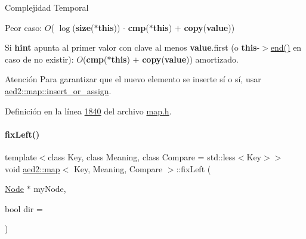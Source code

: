 \begin{DoxyDescription}
\item[Complejidad Temporal]
\begin{DoxyItemize}
\item Peor caso\+: $O$( $\log$({\bfseries size}({\bfseries $\ast$this})) $\cdot$ {\bfseries cmp}({\bfseries $\ast$this}) $+$ {\bfseries copy}({\bfseries value}))
\item Si {\bfseries hint} apunta al primer valor con clave al menos {\bfseries value}.first (o {\bfseries this}-\/$>$\hyperlink{classaed2_1_1map_a76023e6a56cb625513e1b5ea028bf983_a76023e6a56cb625513e1b5ea028bf983}{end()} en caso de no existir)\+: $O$({\bfseries cmp}({\bfseries $\ast$this}) $+$ {\bfseries copy}({\bfseries value})) amortizado. 
\end{DoxyItemize}
\end{DoxyDescription}

\begin{DoxyAttention}{Atención}
Para garantizar que el nuevo elemento se inserte sí o sí, usar \hyperlink{classaed2_1_1map_a2ef6723c183916276b0afc4a4c721475_a2ef6723c183916276b0afc4a4c721475}{aed2\+::map\+::insert\+\_\+or\+\_\+assign}. 
\end{DoxyAttention}


Definición en la línea \hyperlink{map_8h_source_l01840}{1840} del archivo \hyperlink{map_8h_source}{map.\+h}.

\mbox{\label{classaed2_1_1map_ae69c26a9d27f538124cd827646e56feb_ae69c26a9d27f538124cd827646e56feb}} 
\paragraph{\texorpdfstring{fix\+Left()}{fixLeft()}}
{\footnotesize\ttfamily template$<$class Key, class Meaning, class Compare = std\+::less$<$\+Key$>$$>$ \\
void \hyperlink{classaed2_1_1map}{aed2\+::map}$<$ Key, Meaning, Compare $>$\+::fix\+Left (\begin{DoxyParamCaption}\item[{\hyperlink{structaed2_1_1map_1_1Node}{Node} $\ast$}]{my\+Node,  }\item[{bool}]{dir = {} }\end{DoxyParamCaption})\hspace{0.3cm}{\ttfamily [inline]}}



